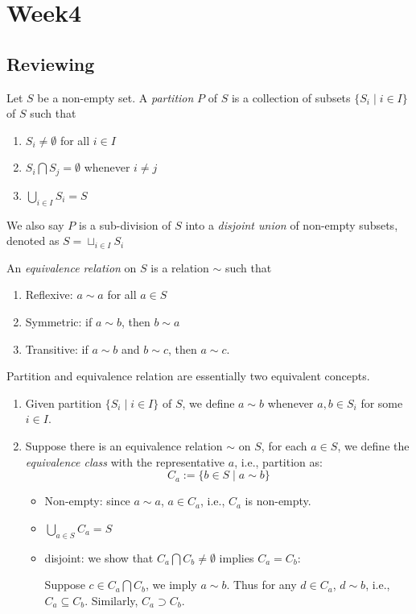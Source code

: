 
\chapter{Week4}

\section{Reviewing}
\begin{definition}[partition]
Let $S$ be a non-empty set. A \emph{partition} $P$ of $S$ is a collection of subsets $\{S_i\mid i\in I\}$ of $S$ such that
\begin{enumerate}
\item
$S_i\ne\emptyset$ for all $i\in I$
\item
$S_i\bigcap S_j=\emptyset$ whenever $i\ne j$
\item
$\bigcup_{i\in I}S_i=S$
\end{enumerate}
We also say $P$ is a sub-division of $S$ into a \emph{disjoint union} of non-empty subsets, denoted as $S=\sqcup_{i\in I} S_i$
\end{definition}
\begin{definition}
An \emph{equivalence relation} on $S$ is a relation $\sim$ such that
\begin{enumerate}
\item
Reflexive: $a\sim a$ for all $a\in S$
\item
Symmetric: if $a\sim b$, then $b\sim a$
\item
Transitive: if $a\sim b$ and $b\sim c$, then $a\sim c$.
\end{enumerate}
\end{definition}
Partition and equivalence relation are essentially two equivalent concepts.
\begin{enumerate}
\item
Given partition $\{S_i\mid i\in I\}$ of $S$, we define $a\sim b$ whenever $a,b\in S_i$ for some $i\in I$.
\item
Suppose there is an equivalence relation $\sim$ on $S$, for each $a\in S$, we define the \emph{equivalence class }with the representative $a$, i.e., partition as:
\[
C_a:=\{b\in S\mid a\sim b\}
\]
\begin{itemize}
\item
Non-empty: since $a\sim a$, $a\in C_a$, i.e., $C_a$ is non-empty.
\item
$\bigcup_{a\in S}C_a=S$
\item
disjoint: we show that $C_a\bigcap C_b\ne\emptyset$ implies $C_a=C_b$:

Suppose $c\in C_a\bigcap C_b$, we imply $a\sim b$. Thus for any $d\in C_a$, $d\sim b$, i.e., $C_a\subseteq C_b$. Similarly, $C_a\supset C_b$.
\end{itemize}

\end{enumerate}
